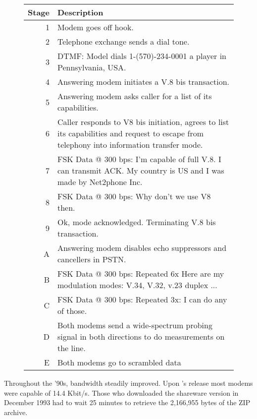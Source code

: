  \begin{figure}[H]
\centering  
\begin{tabularx}{\textwidth}{ R{0.1} L{1.9} }
  \toprule
  \textbf{Stage} &  \textbf{Description} \\
  \toprule 
   
   1 & Modem goes off hook.\\
   2 & Telephone exchange sends a dial tone.\\
   3 & DTMF: Model dials 1-(570)-234-0001 a \doom{} player in Pennsylvania, USA.\\
   4 & Answering modem initiates a V.8 bis transaction.\\
   5 & Answering modem asks caller for a list of its capabilities.\\
   6 & Caller responds to V8 bis initiation, agrees to list its capabilities and request to escape from telephony into information transfer mode.\\
   7 & FSK Data @ 300 bps: I'm capable of full V.8. I can transmit ACK. My country is US and I was made by Net2phone Inc.\\
   8 & FSK Data @ 300 bps: Why don't we use V8 then.\\
   9 & Ok, mode acknowledged. Terminating V.8 bis transaction.\\
   \toprule 
   A & Answering modem disables echo suppressors and cancellers in PSTN.\\
   B & FSK Data @ 300 bps: Repeated 6x Here are my modulation modes: V.34, V.32, v.23 duplex ...\\
   C & FSK Data @ 300 bps: Repeated 3x: I can do any of those. \\
   D & Both modems send a wide-spectrum probing signal in both directions to do measurements on the line.\\
   E & Both modems go to scrambled data \\
   \toprule
\end{tabularx}
\caption{}
\end{figure}
\par




Throughout the '90s, bandwidth steadily improved. Upon \doom{}'s release most modems were capable of 14.4 Kbit/s. Those who downloaded the shareware version in December 1993 had to wait 25 minutes to retrieve the 2,166,955 bytes of the ZIP archive.

